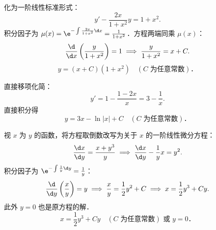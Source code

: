 \begin{solution}

    化为一阶线性标准形式：
    \begin{equation}
        y' - \frac{2x}{1+x^2}y = 1 + x^2.
    \end{equation}
    积分因子为 $\mu(x) = \e^{-\int \frac{2x}{1+x^2}\d x} = \frac{1}{1+x^2}$．方程两端同乘 $\mu(x)$：
    \begin{equation}
        \frac{\d}{\d x}\left( \frac{y}{1+x^2} \right) = 1 \implies \frac{y}{1+x^2} = x + C.
    \end{equation}
    \begin{equation}
        \boxed{y = (x + C)(1 + x^2) \quad (C \text{ 为任意常数})．}
    \end{equation}


    直接移项化简：
    \begin{equation}
        y' = 1 - \frac{1-2x}{x} = 3 - \frac{1}{x}.
    \end{equation}
    直接积分得
    \begin{equation}
        \boxed{y = 3x - \ln|x| + C \quad (C \text{ 为任意常数})．}
    \end{equation}


    视 $x$ 为 $y$ 的函数，将方程取倒数改写为关于 $x$ 的一阶线性微分方程：
    \begin{equation}
        \frac{\d x}{\d y} = \frac{x + y^3}{y} \implies \frac{\d x}{\d y} - \frac{1}{y}x = y^2.
    \end{equation}
    积分因子为 $\e^{-\int \frac{1}{y}\d y} = \frac{1}{y}$：
    \begin{equation}
        \frac{\d}{\d y}\left( \frac{x}{y} \right) = y \implies \frac{x}{y} = \frac{1}{2}y^2 + C \implies x = \frac{1}{2}y^3 + Cy.
    \end{equation}
    此外 $y = 0$ 也是原方程的解．
    \begin{equation}
        \boxed{x = \frac{1}{2}y^3 + Cy \quad (C \text{ 为任意常数}) \text{ 或 } y = 0．}
    \end{equation}



\end{solution}
